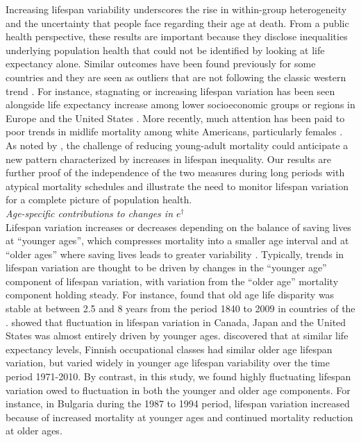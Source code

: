 \documentclass{article}
\begin{document}
\begin{spacing}{1.5}
Increasing lifespan variability underscores the rise in within-group heterogeneity and the uncertainty that people face regarding their age at death.  From a public health perspective, these results are important because they disclose inequalities underlying population health that could not be identified by looking at life expectancy alone. Similar outcomes have been found previously for some countries and they are seen as outliers that are not following the classic western trend \citep{wilmoth1999,zhang2009}. For instance, stagnating or increasing lifespan variation has been seen alongside life expectancy increase among lower socioeconomic groups or regions in Europe \citep{vanraalte2014,bronnum-hansen2017,seaman2016increasing} and the United States \citep{sasson2016trends}. More recently, much attention has been paid to poor trends in midlife mortality among white Americans, particularly females \citep{case2015rising,montez2013trends}. As noted by \citet{gillespie2014divergence}, the challenge of reducing young-adult mortality could anticipate a new pattern characterized by increases in lifespan inequality. Our results are further proof of the independence of the two measures during long periods with atypical mortality schedules and illustrate the need to monitor lifespan variation for a complete picture of population health.\\

\emph{Age-specific contributions to changes in $e^\dagger$}\\

Lifespan variation increases or decreases depending on the balance of saving lives at ``younger ages'', which compresses mortality into a smaller age interval and at ``older ages'' where saving lives leads to greater variability \citep{zhang2009, gillespie2014divergence,vanraalte2013}. Typically, trends in lifespan variation are thought to be driven by changes in the ``younger age'' component of lifespan variation, with variation from the ``older age'' mortality component holding steady. For instance, \citet{vaupel2011} found that old age life disparity was stable at between 2.5 and 8 years from the period 1840 to 2009 in countries of the \cite{HMD}. \citet{gillespie2014divergence} showed that fluctuation in lifespan variation in Canada, Japan and the United States was almost entirely driven by younger ages. \citet{vanraalte2014} discovered that at similar life expectancy levels, Finnish occupational classes had similar older age lifespan variation, but varied widely in younger age lifespan variability over the time period 1971-2010.  By contrast, in this study, we found highly fluctuating lifespan variation owed to fluctuation in both the younger and older age components. For instance, in Bulgaria during the 1987 to 1994 period, lifespan variation increased because of increased mortality at younger ages and continued mortality reduction at older ages. \\


\end{spacing}
\end{document}
